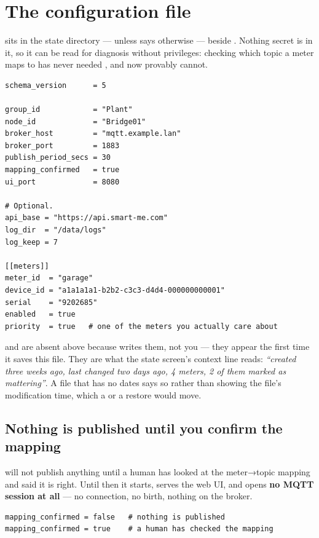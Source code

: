 \section{The configuration file}
\label{sec:configfile}

 sits in the state directory ---  unless
 says otherwise --- beside . Nothing secret is
in it, so it can be read for diagnosis without privileges: checking which topic a meter
maps to has never needed , and now provably cannot.

\begin{lstlisting}
schema_version      = 5

group_id            = "Plant"
node_id             = "Bridge01"
broker_host         = "mqtt.example.lan"
broker_port         = 1883
publish_period_secs = 30
mapping_confirmed   = true
ui_port             = 8080

# Optional.
api_base = "https://api.smart-me.com"
log_dir  = "/data/logs"
log_keep = 7

[[meters]]
meter_id  = "garage"
device_id = "a1a1a1a1-b2b2-c3c3-d4d4-000000000001"
serial    = "9202685"
enabled   = true
priority  = true   # one of the meters you actually care about
\end{lstlisting}

\begin{note}
 and  are absent above because \prog writes them,
not you --- they appear the first time it saves this file. They are what the state screen's
context line reads: \emph{``created three weeks ago, last changed two days ago, 4 meters, 2
of them marked as mattering''}. A file that has no dates says so rather than showing the
file's modification time, which a  or a restore would move.
\end{note}

\subsection{Nothing is published until you confirm the mapping}
\label{sec:confirm}

\prog will not publish anything until a human has looked at the meter→topic mapping and said it is
right. Until then it starts, serves the web UI, and opens \textbf{no MQTT session at all} --- no
connection, no birth, nothing on the broker.

\begin{lstlisting}
mapping_confirmed = false   # nothing is published
mapping_confirmed = true    # a human has checked the mapping
\end{lstlisting}


